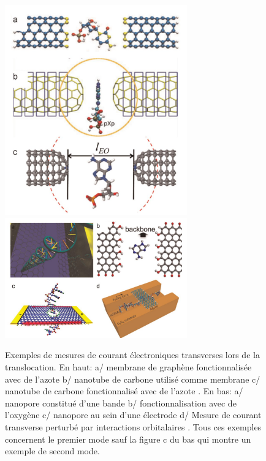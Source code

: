 \begin{figure}[H]
\begin{center}
\includegraphics[width=0.7\textwidth]{couranttransv2.jpg}
\includegraphics[width=0.7\textwidth]{couranttransv1.jpg}

\caption[Montages pour mesure du courant transverse]{Exemples de mesures de courant électroniques transverses lors de la translocation. En haut:  a/ membrane de graphène fonctionnalisée avec de l'azote \cite{Meunier2008} b/ nanotube de carbone utilisé comme membrane \cite{Chen2012} c/ nanotube de carbone fonctionnalisé avec de l'azote \cite{Kim2013}. En bas:  a/ nanopore constitué d'une bande \cite{Postma2010} b/ fonctionnalisation avec de l'oxygène \cite{Jeong2013} c/ nanopore au sein d'une électrode \cite{Saha2012} d/ Mesure de courant transverse perturbé par interactions orbitalaires \cite{Min2011}. Tous ces exemples concernent le premier mode sauf la figure c du bas qui montre un exemple de second mode.}
\label{couranttransv2}
\end{center}
\end{figure}







